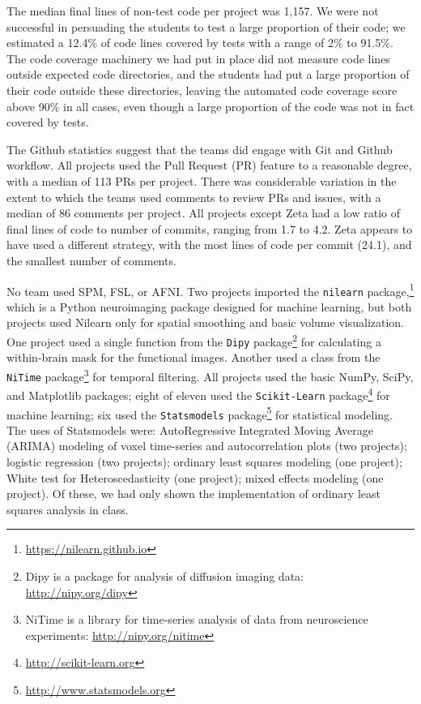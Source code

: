 The median final lines of non-test code per project was 1,157.  We were not
successful in persuading the students to test a large proportion of their
code; we estimated a 12.4\% of code lines covered by tests with a range of 2\%
to 91.5\%.  The code coverage machinery we had put in place did not measure
code lines outside expected code directories, and the students had put a
large proportion of their code outside these directories, leaving the
automated code coverage score above 90\% in all cases, even though a large
proportion of the code was not in fact covered by tests.

The Github statistics suggest that the teams did engage with Git and Github
workflow.  All projects used the Pull Request (PR) feature to a reasonable
degree, with a median of 113 PRs per project.  There was considerable
variation in the extent to which the teams used comments to review PRs and
issues, with a median of 86 comments per project. All projects except Zeta had
a low ratio of final lines of code to number of commits, ranging from 1.7 to
4.2.  Zeta appears to have used a different strategy, with the most lines of
code per commit (24.1), and the smallest number of comments.

No team used SPM, FSL, or AFNI.  Two projects imported the
\texttt{nilearn} package,\footnote{\url{https://nilearn.github.io}} which is a
Python neuroimaging package designed for machine learning, but both projects
used Nilearn only for spatial smoothing and basic volume visualization.  One
project used a single function from the
\texttt{Dipy} package\footnote{Dipy is a package for analysis of diffusion
imaging data: \url{http://nipy.org/dipy}} for calculating a
within-brain mask for the functional images.  Another used a class from the
\texttt{NiTime} package\footnote{NiTime is a library for time-series analysis
of data from neuroscience experiments: \url{http://nipy.org/nitime}} for
temporal filtering.  All projects used the basic NumPy, SciPy, and Matplotlib
packages; eight of eleven used the \texttt{Scikit-Learn}
package\footnote{\url{http://scikit-learn.org}} for machine learning; six used
the \texttt{Statsmodels} package\footnote{\url{http://www.statsmodels.org}}
for statistical modeling.  The uses of Statsmodels were: AutoRegressive
Integrated Moving Average (ARIMA) modeling of voxel time-series and
autocorrelation plots (two projects); logistic regression (two projects);
ordinary least squares modeling (one project); White test for
Heteroscedasticity (one project); mixed effects modeling (one project).  Of
these, we had only shown the implementation of ordinary least squares analysis
in class.

